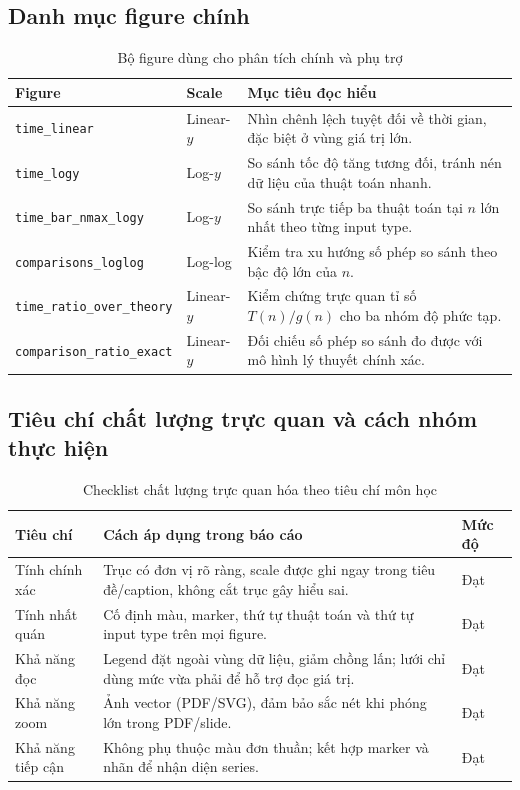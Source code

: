\subsection{Danh mục figure chính}

\begin{table}[H]
\centering
\renewcommand{\arraystretch}{1.2}
\begin{tabular}{p{4.4cm}p{2.3cm}p{6.8cm}}
\toprule
\textbf{Figure} & \textbf{Scale} & \textbf{Mục tiêu đọc hiểu} \\
\midrule
\texttt{time\_linear} & Linear-$y$ & Nhìn chênh lệch tuyệt đối về thời gian, đặc biệt ở vùng giá trị lớn. \\
\texttt{time\_logy} & Log-$y$ & So sánh tốc độ tăng tương đối, tránh nén dữ liệu của thuật toán nhanh. \\
\texttt{time\_bar\_nmax\_logy} & Log-$y$ & So sánh trực tiếp ba thuật toán tại $n$ lớn nhất theo từng input type. \\
\texttt{comparisons\_loglog} & Log-log & Kiểm tra xu hướng số phép so sánh theo bậc độ lớn của $n$. \\
\texttt{time\_ratio\_over\_theory} & Linear-$y$ & Kiểm chứng trực quan tỉ số $T(n)/g(n)$ cho ba nhóm độ phức tạp. \\
\texttt{comparison\_ratio\_exact} & Linear-$y$ & Đối chiếu số phép so sánh đo được với mô hình lý thuyết chính xác. \\
\bottomrule
\end{tabular}
\caption{Bộ figure dùng cho phân tích chính và phụ trợ}
\label{tab:figure-catalog}
\end{table}

\subsection{Tiêu chí chất lượng trực quan và cách nhóm thực hiện}

\begin{table}[H]
\centering
\renewcommand{\arraystretch}{1.2}
\begin{tabular}{p{3.3cm}p{7.9cm}p{2.3cm}}
\toprule
\textbf{Tiêu chí} & \textbf{Cách áp dụng trong báo cáo} & \textbf{Mức độ} \\
\midrule
Tính chính xác & Trục có đơn vị rõ ràng, scale được ghi ngay trong tiêu đề/caption, không cắt trục gây hiểu sai. & Đạt \\
Tính nhất quán & Cố định màu, marker, thứ tự thuật toán và thứ tự input type trên mọi figure. & Đạt \\
Khả năng đọc & Legend đặt ngoài vùng dữ liệu, giảm chồng lấn; lưới chỉ dùng mức vừa phải để hỗ trợ đọc giá trị. & Đạt \\
Khả năng zoom & Ảnh vector (PDF/SVG), đảm bảo sắc nét khi phóng lớn trong PDF/slide. & Đạt \\
Khả năng tiếp cận & Không phụ thuộc màu đơn thuần; kết hợp marker và nhãn để nhận diện series. & Đạt \\
\bottomrule
\end{tabular}
\caption{Checklist chất lượng trực quan hóa theo tiêu chí môn học}
\label{tab:viz-quality-checklist}
\end{table}

